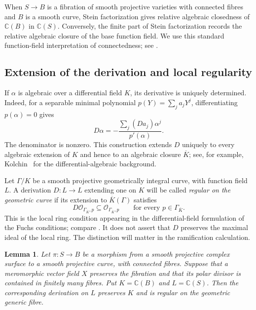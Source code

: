 \documentclass[11pt,reqno]{amsart}
\numberwithin{equation}{section}
\newtheorem{lemma}[theorem]{Lemma}
\theoremstyle{definition}
\theoremstyle{remark}
\newcommand{\C}{\mathbb C}
\newcommand{\OO}{\mathcal O}
\begin{document}
When $S\to B$ is a fibration of smooth projective varieties with
connected fibres and $B$ is a smooth curve, Stein factorization gives
relative algebraic closedness of $\C(B)$ in $\C(S)$. Conversely, the
finite part of Stein factorization records the relative algebraic
closure of the base function field. We use this standard
function-field interpretation of connectedness; see
\cite[Chapter~III, Section~11]{Hartshorne1977}.

\subsection{Extension of the derivation and local regularity}

If $\alpha$ is algebraic over a differential field $K$, its derivative
is uniquely determined. Indeed, for a separable minimal polynomial
$p(Y)=\sum_j a_jY^j$, differentiating $p(\alpha)=0$ gives
\begin{equation}
 D\alpha=-\frac{\sum_j(Da_j)\alpha^j}{p'(\alpha)}.
 \label{eq:algebraic-derivative}
\end{equation}
The denominator is nonzero. This construction extends $D$ uniquely to
every algebraic extension of $K$ and hence to an algebraic closure
$\overline K$; see, for example, Kolchin~\cite{Kolchin1973} for the
differential-algebraic background.

Let $\Gamma/K$ be a smooth projective geometrically integral curve,
with function field $L$. A derivation $D:L\to L$ extending one on $K$
will be called \emph{regular on the geometric curve} if its extension
to $\overline K(\Gamma)$ satisfies
\begin{equation}
 D\OO_{\Gamma_{\overline K},p}
 \subseteq\OO_{\Gamma_{\overline K},p}
 \qquad\text{for every }p\in\Gamma_{\overline K}.
 \label{eq:geometric-regularity}
\end{equation}
This is the local ring condition appearing in the differential-field
formulation of the Fuchs conditions; compare
\cite[Section~1, Definition~1]{Eremenko1982}. It does not assert that
$D$ preserves the maximal ideal of the local ring. The distinction will
matter in the ramification calculation.

\begin{lemma}
\label{lem:base-change}
Let $\pi:S\to B$ be a morphism from a smooth projective complex surface
to a smooth projective curve, with connected fibres. Suppose that a
meromorphic vector field $X$ preserves the fibration and that its polar
divisor is contained in finitely many fibres. Put
$K=\C(B)$ and $L=\C(S)$. Then the corresponding derivation on $L$
preserves $K$ and is regular on the geometric generic fibre.
\end{lemma}
\end{document}
